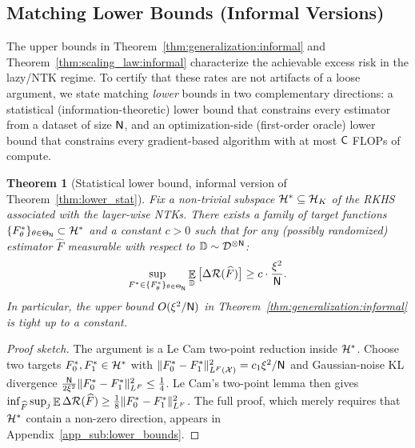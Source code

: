 \documentclass[11pt]{article}
\theoremstyle{plain}
\newtheorem{theorem}{Theorem}[section]
\newcommand{\wh}{\widehat}
\renewcommand{\hat}{\wh}
\DeclareMathOperator*{\E}{{\mathbb{E}}}
\begin{document}
\subsection{Matching Lower Bounds (Informal Versions)}\label{app_sub:lower_bounds_main}

The upper bounds in Theorem~\ref{thm:generalization:informal} and Theorem~\ref{thm:scaling_law:informal} characterize the achievable excess risk in the lazy/NTK regime. To certify that these rates are not artifacts of a loose argument, we state matching {\it lower} bounds in two complementary directions: a statistical (information-theoretic) lower bound that constrains every estimator from a dataset of size ${\sf N}$, and an optimization-side (first-order oracle) lower bound that constrains every gradient-based algorithm with at most ${\sf C}$ FLOPs of compute.

\begin{theorem}[Statistical lower bound, informal version of Theorem~\ref{thm:lower_stat}]\label{thm:lower_stat:informal}
    Fix a non-trivial subspace ${\cal H}^*\subseteq{\cal H}_K$ of the RKHS associated with the layer-wise NTKs. There exists a family of target functions $\{F_\theta^*\}_{\theta\in\Theta_{\sf N}}\subset {\cal H}^*$ and a constant $c>0$ such that for any (possibly randomized) estimator $\hat F$ measurable with respect to $\mathbb{D}\sim {\cal D}^{\otimes {\sf N}}$:
    \begin{align*}
        \sup_{F^*\in\{F_\theta^*\}_{\theta\in\Theta_{\sf N}}}\E_{\mathbb{D}}\big[\Delta{\cal R}(\hat F)\big] \ge c \cdot \frac{\xi^2}{{\sf N}}.
    \end{align*}
    In particular, the upper bound $O(\xi^2/{\sf N})$ in Theorem~\ref{thm:generalization:informal} is tight up to a constant.
\end{theorem}

\begin{proof}[Proof sketch]
    The argument is a Le Cam two-point reduction inside ${\cal H}^*$. Choose two targets $F_0^*, F_1^* \in {\cal H}^*$ with $\|F_0^*-F_1^*\|_{L^F({\cal X})}^2 = c_1\xi^2/{\sf N}$ and Gaussian-noise KL divergence $\frac{{\sf N}}{2\xi^2}\|F_0^*-F_1^*\|_{L^F}^2 \le \frac{1}{4}$. Le Cam's two-point lemma then gives $\inf_{\hat F}\sup_j\E\Delta{\cal R}(\hat F)\ge \frac{1}{8}\|F_0^*-F_1^*\|_{L^F}^2$. The full proof, which merely requires that ${\cal H}^*$ contain a non-zero direction, appears in Appendix~\ref{app_sub:lower_bounds}.
\end{proof}
\end{document}
